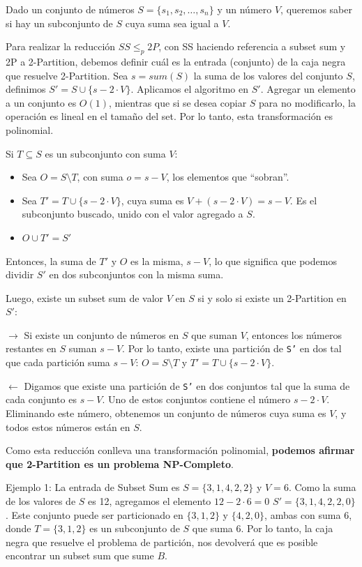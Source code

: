 \documentclass{article}
\begin{document}
Dado un conjunto de números \( S = \{s_1, s_2, \ldots, s_n\} \) y un número \( V \), queremos saber si hay un subconjunto de \( S \) cuya suma sea igual a \( V \).

Para realizar la reducción $SS \leq_p 2P$, con SS haciendo referencia a subset sum y 2P a 2-Partition, debemos definir cuál es la entrada (conjunto) de la caja negra que resuelve 2-Partition. Sea $s = sum(S)$ la suma de los valores del conjunto $S$, definimos \( S' = S \cup \{s - 2\cdot V\} \). Aplicamos el algoritmo en $S'$. Agregar un elemento a un conjunto es $O(1)$, mientras que si se desea copiar $S$ para no modificarlo, la operación es lineal en el tamaño del set. Por lo tanto, esta transformación es polinomial.

Si \( T \subseteq S \) es un subconjunto con suma \( V \):

\begin{itemize}
    \item Sea \( O = S \setminus T \), con suma \( o = s - V \), los elementos que ``sobran''.
    \item Sea \( T' = T \cup \{s - 2 \cdot V\} \), cuya suma es \( V + (s - 2 \cdot V) = s - V \). Es el subconjunto buscado, unido con el valor agregado a $S$.
    \item $ O \cup T' = S'$
\end{itemize}

Entonces, la suma de \( T' \) y \( O \) es la misma, \( s - V \), lo que significa que podemos dividir \( S' \) en dos subconjuntos con la misma suma.

Luego, existe un subset sum de valor $V$ en $S$ si y solo si existe un 2-Partition en $S'$:

    $\rightarrow$ Si existe un conjunto de números en $S$ que suman $V$, entonces los números restantes en $S$ suman \(s - V\). Por lo tanto, existe una partición de \texttt{S'} en dos tal que cada partición suma \(s - V\): \( O = S \setminus T \) y \( T' = T \cup \{s - 2 \cdot V\} \). 

    $\leftarrow$ Digamos que existe una partición de \texttt{S'} en dos conjuntos tal que la suma de cada conjunto es \(s - V\). Uno de estos conjuntos contiene el número \(s - 2 \cdot V\). Eliminando este número, obtenemos un conjunto de números cuya suma es $V$, y todos estos números están en $S$.

Como esta reducción conlleva una transformación polinomial, \textbf{podemos afirmar que 2-Partition es un problema NP-Completo}.

Ejemplo 1: La entrada de Subset Sum es \( S = \{3, 1, 4, 2, 2\} \) y \( V = 6 \). Como la suma de los valores de $S$ es 12, agregamos el elemento $12 - 2 \cdot 6 = 0$ \( S' = \{3, 1, 4, 2, 2, 0\} \). Este conjunto puede ser particionado en \( \{3, 1, 2\} \) y \( \{4, 2, 0\} \), ambas con suma 6, donde \( T = \{3, 1, 2\} \) es un subconjunto de \( S \) que suma \( 6 \). Por lo tanto, la caja negra que resuelve el problema de partición, nos devolverá que es posible encontrar un subset sum que sume $B$.
\end{document}
